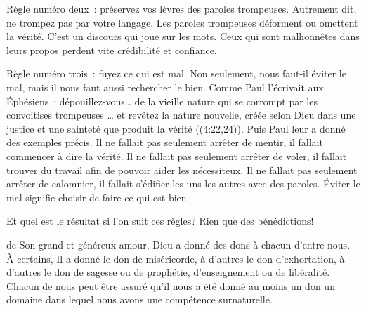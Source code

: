 Règle numéro deux~: préservez vos lèvres des paroles trompeuses.
 Autrement dit, ne trompez pas par votre langage. Les paroles trompeuses
 déforment ou omettent la vérité. C'est un discours qui joue sur les mots.
 Ceux qui sont malhonnêtes dans leurs propos perdent vite
 crédibilité et confiance.


Règle numéro trois~: fuyez ce qui est mal.
 Non seulement, nous faut-il éviter le mal, mais il nous faut aussi rechercher
 le bien. Comme Paul l'écrivait aux Éphésiens~: 
 \og dépouillez-vous\dots{} de la vieille nature qui se corrompt
 par les convoitises trompeuses 
 \dots{} et revêtez la nature nouvelle, créée selon Dieu dans une justice
 et une sainteté que produit la vérité \fg{} 
 ((4:22,24)).
 Puis Paul leur a donné des exemples précis.
 Il ne fallait pas seulement arrêter de mentir,
 il fallait commencer à dire la vérité. Il ne fallait pas seulement arrêter
 de voler, il fallait trouver du travail afin de pouvoir aider les nécessiteux.
 Il ne fallait pas seulement arrêter de calomnier, il fallait s'édifier
 les uns les autres avec des paroles. Éviter le mal signifie choisir
 de faire ce qui est bien.

Et quel est le résultat si l'on suit ces règles? Rien que des bénédictions!

\dvrule






 de Son grand et généreux amour,
 Dieu a donné des dons à chacun d'entre nous.
 À certains, Il a donné le don de miséricorde, à d'autres le don d'exhortation,
 à d'autres le don de sagesse ou de prophétie, d'enseignement ou de libéralité.
 Chacun de nous peut être assuré qu'il nous a été donné au moins un don
 \ocadr un domaine dans lequel nous avons une compétence surnaturelle.

